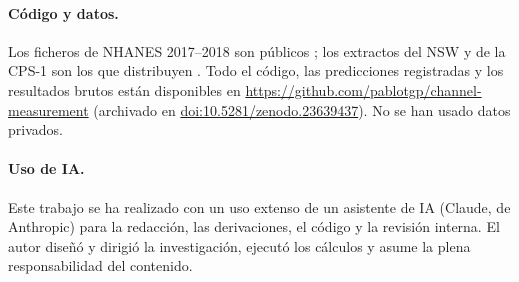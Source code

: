 \paragraph{Código y datos.} Los ficheros de NHANES 2017--2018 son públicos \citep{nchs2020}; los extractos del NSW y de la CPS-1 son los que distribuyen \citet{dehejia1999}. Todo el código, las predicciones registradas y los resultados brutos están disponibles en \url{https://github.com/pablotgp/channel-measurement} (archivado en \href{https://doi.org/10.5281/zenodo.23639437}{doi:10.5281/zenodo.23639437}). No se han usado datos privados.

\paragraph{Uso de IA.} Este trabajo se ha realizado con un uso extenso de un asistente de IA (Claude, de Anthropic) para la redacción, las derivaciones, el código y la revisión interna. El autor diseñó y dirigió la investigación, ejecutó los cálculos y asume la plena responsabilidad del contenido.
